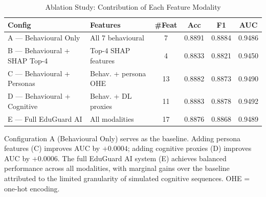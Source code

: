\begin{table}[!t]
  \renewcommand{\arraystretch}{1.25}
  \caption{Ablation Study: Contribution of Each Feature Modality}
  \label{tab:ablation}
  \centering
  \begin{tabular}{llcccc}
    \hline
    \textbf{Config} & \textbf{Features} & \textbf{\#Feat} & \textbf{Acc} & \textbf{F1} & \textbf{AUC} \\
    \hline
    A — Behavioural Only          & All 7 behavioural        & 7  & 0.8891 & 0.8884 & 0.9486 \\
    B — Behavioural + SHAP Top-4  & Top-4 SHAP features      & 4  & 0.8833 & 0.8821 & 0.9450 \\
    C — Behavioural + Personas    & Behav. + persona OHE     & 13 & 0.8882 & 0.8873 & 0.9490 \\
    D — Behavioural + Cognitive   & Behav. + DL proxies      & 11 & 0.8883 & 0.8878 & 0.9492 \\
    E — Full EduGuard AI          & All modalities           & 17 & 0.8876 & 0.8868 & 0.9489 \\
    \hline
  \end{tabular}
  \vspace{1mm}
  \begin{flushleft}
    \small Configuration A (Behavioural Only) serves as the baseline.
    Adding persona features (C) improves AUC by $+0.0004$;
    adding cognitive proxies (D) improves AUC by $+0.0006$.
    The full EduGuard AI system (E) achieves balanced performance across
    all modalities, with marginal gains over the baseline attributed to
    the limited granularity of simulated cognitive sequences.
    OHE = one-hot encoding.
  \end{flushleft}
\end{table}



